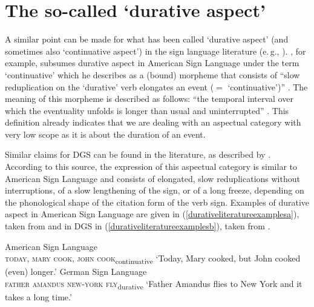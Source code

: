 \section{The so-called `durative aspect'}\label{durativecontinuative}
A similar point can be made for what has been called `durative aspect' (and sometimes also `continuative aspect') in the sign language literature (e.\,g., \citealt{rathmann2005event,brunelli2011antisymmetry}). \citet{rathmann2005event}, for example, subsumes durative aspect in American Sign Language under the term `continuative' which he describes as a (bound) morpheme that consists of ``slow reduplication on the `durative' verb elongates an event ($=$ `continuative')'' \citep[27]{rathmann2005event}. The meaning of this morpheme is described as follows: ``the temporal interval over which the eventuality unfolds is longer than usual and uninterrupted'' \citep[36]{rathmann2005event}. This definition already indicates that we are dealing with an aspectual category with very low scope as it is about the duration of an event.


Similar claims for DGS can be found in the literature, as described by \citet[145, 282]{happ2014vork}. According to this source, the expression of this aspectual category is similar to American Sign Language and consists of elongated, slow reduplications without interruptions, of a slow lengthening of the sign, or of a long freeze, depending on the phonological shape of the citation form of the verb sign. Examples of durative aspect in American Sign Language are given in (\ref{durativeliteratureexamplesa}), taken from \citet[35]{rathmann2005event} and in DGS in (\ref{durativeliteratureexamplesb}), taken from \citet[145]{happ2014vork}.

\begin{exe}
\ex  \label{ex:durativeliteratureexamples}\begin{xlist} 
\ex American Sign Language \citep[35]{rathmann2005event} \\ {\textsc{today, mary cook, john cook}\textsubscript{continuative}} 
\glt `Today, Mary cooked, but John cooked (even) longer.' \label{durativeliteratureexamplesa}
\ex German Sign Language \citep[146]{happ2014vork} \\ {\textsc{father amandus new-york fly}\textsubscript{durative}}
\glt `Father Amandus flies to New York and it takes a long time.' \label{durativeliteratureexamplesb}
\end{xlist}
\end{exe}

